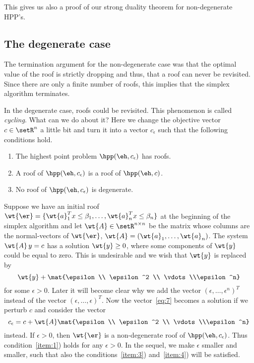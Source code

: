 This gives us also a proof of our strong duality theorem for
non-degenerate HPP's. 






\subsection{The degenerate case}
\label{sec:degenerate-case}

The termination argument for the non-degenerate case was that the
optimal value of the roof is strictly dropping and thus, that a
roof can never be revisited. Since there are only a finite number
of roofs, this implies that the simplex algorithm terminates.

In the degenerate case, roofs could be revisited. This phenomenon
is called \emph{cycling}. What can we do about it? Here we change the
objective vector $c \in \setR^n$ a little bit and turn it into a vector
$c_\epsilon$ such that the following conditions hold. 

\begin{enumerate}
\item The highest point problem $\hpp(\eh,c_\epsilon)$ has roofs.\label{item:1}
\item A roof of $\hpp(\eh,c_\epsilon)$ is a roof of $\hpp(\eh,c)$.\label{item:3}
\item No roof of $\hpp(\eh,c_\epsilon)$ is degenerate. \label{item:4}
\end{enumerate}


Suppose we have an initial roof
$\wt{\er}=\{\wt{a}_1^Tx\leq\beta_1,\ldots,\wt{a}_n^Tx\leq\beta_n\}$ at the beginning of the
simplex algorithm and let $\wt{A}\in \setR^{n\times n}$ be the matrix whose
columns are the normal-vectors of $\wt{\er}$,
$\wt{A}=\left(\wt{a}_1,\ldots,\wt{a}_n\right)$. The system $\wt{A} \,y =c$
has a solution $\wt{y}\geq0$, where some components of $\wt{y}$ could be equal
to zero. This is undesirable and we wish that $\wt{y}$ is replaced by
\begin{equation}
  \label{eq:7}
  \wt{y} +  \mat{\epsilon \\ \epsilon^2 \\ \vdots \\\epsilon^n}
\end{equation}
for some $\epsilon>0$. Later it will
become clear why we add the vector $(\epsilon,\ldots,\epsilon^n)^T$ instead of the vector
$(\epsilon,\ldots,\epsilon)^T$. Now the vector~\eqref{eq:7} becomes a solution if we
perturb $c$ and consider the vector 
\begin{equation}
  \label{eq:18}
  c_\epsilon = c + \wt{A} \mat{\epsilon \\ \epsilon^2 \\ \vdots \\\epsilon^n}
\end{equation}
instead. If $\epsilon>0$, then $\wt{\er}$ is a non-degenerate roof of
$\hpp(\eh,c_\epsilon)$. Thus condition~\ref{item:1}) holds for any $\epsilon>0$. In
the sequel, we make $\epsilon$ smaller and smaller, such that also the
conditions~\ref{item:3}) and~\ref{item:4}) will be satisfied. 

